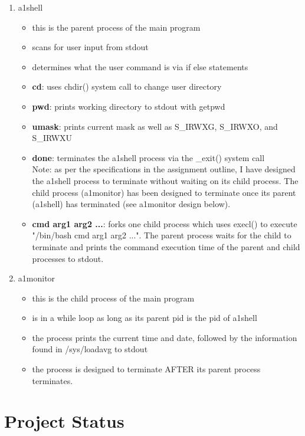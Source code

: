 \documentclass{article}
\begin{document}
\begin{enumerate}
   \item a1shell
   \begin{itemize}
     \item this is the parent process of the main program
     \item scans for user input from stdout
     \item determines what the user command is via if else statements
     \item \textbf{cd}: uses chdir() system call to change user directory
     \item \textbf{pwd}: prints working directory to stdout with getpwd
     \item \textbf{umask}: prints current mask as well as S_IRWXG, S_IRWXO, and S_IRWXU
     \item \textbf{done}: terminates the a1shell process via the _exit() system call \\
     Note: as per the specifications in the assignment outline, I have designed the a1shell
     process to terminate without waiting on its child process. The child process (a1monitor) has
     been designed to terminate once its parent (a1shell) has terminated (see a1monitor design
     below).
     \item \textbf{cmd arg1 arg2 ...}: forks one child process which uses execl() to execute
     "/bin/bash cmd arg1 arg2 ...". The parent process waits for the child to terminate and
     prints the command execution time of the parent and child processes to stdout.
   \end{itemize}
   \item a1monitor
   \begin{itemize}
     \item this is the child process of the main program
     \item is in a while loop as long as its parent pid is the pid of a1shell
     \item the process prints the current time and date, followed by the information found
     in /sys/loadavg to stdout
     \item the process is designed to terminate AFTER its parent process terminates.
   \end{itemize}
\end{enumerate}

\section{Project Status}
\end{document}

